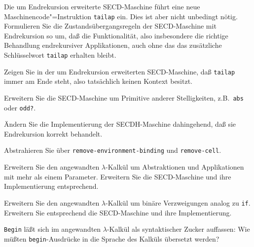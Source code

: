 \begin{aufgabe}
  Die um Endrekursion erweiterte SECD-Maschine führt eine neue
  Maschinencode"=Instruktion \texttt{tailap} ein.  Dies ist aber nicht
  unbedingt nötig.  Formulieren Sie die Zustandsübergangsregeln der
  SECD-Maschine mit Endrekursion so um, daß die Funktionalität, also
  insbesondere die richtige Behandlung endrekursiver Applikationen,
  auch ohne das das zusätzliche Schlüsselwort \texttt{tailap}
  erhalten bleibt.
\end{aufgabe}

\begin{aufgabe}
  Zeigen Sie in der um Endrekursion erweiterten
  SECD-Maschine, daß \texttt{tailap} immer am Ende steht, also
  tatsächlich keinen Kontext besitzt.
\end{aufgabe}

\begin{aufgabe}\label{aufgabe:prim-arity}
  Erweitern Sie die SECD-Maschine um Primitive anderer Stelligkeiten,
  z.B.\ \texttt{abs} oder \texttt{odd?}.
\end{aufgabe}

\begin{aufgabe}
  Ändern Sie die Implementierung der SECDH-Maschine dahingehend, daß
  sie Endrekursion korrekt behandelt.
\end{aufgabe}

\begin{aufgabe}
  Abstrahieren Sie über \texttt{remove-environment-binding} und
  \texttt{remove-cell}.
\end{aufgabe}

\begin{aufgabe}
  Erweitern Sie den angewandten $\lambda$-Kalkül um Abstraktionen und
  Applikationen mit mehr als einem Parameter.  Erweitern Sie die
  SECD-Maschine und ihre Implementierung entsprechend.
\end{aufgabe}


\begin{aufgabe}
  Erweitern Sie den angewandten $\lambda$-Kalkül um binäre
  Verzweigungen analog zu \texttt{if}.  Erweitern Sie entsprechend die
  SECD-Maschine und ihre Implementierung.
\end{aufgabe}

\begin{aufgabe}
  \texttt{Begin} läßt sich im angewandten $\lambda$-Kalkül als
  syntaktischer Zucker auffassen: Wie müßten \texttt{begin}-Ausdrücke
  in die Sprache des Kalküls übersetzt werden?
\end{aufgabe}


